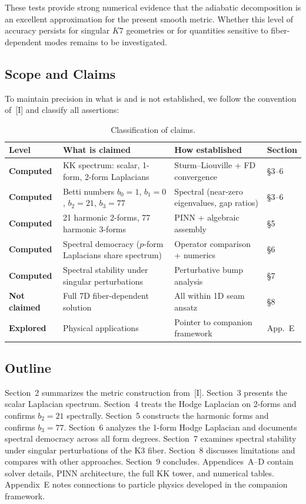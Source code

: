 \documentclass[11pt,a4paper]{article}
\newcommand{\Kseven}{K_7}
\newcommand{\PINN}{\mathrm{PINN}}
\theoremstyle{remark}
\def\Kseven{K7}%
\begin{document}
These tests provide strong numerical evidence that the adiabatic decomposition is
an excellent approximation for the present smooth metric. Whether this level of
accuracy persists for singular $\Kseven$ geometries or for quantities sensitive to
fiber-dependent modes remains to be investigated.

\subsection{Scope and Claims}

To maintain precision in what is and is not established, we follow the convention
of~[I] and classify all assertions:

\begin{table}[htbp]
\centering
\small
\begin{tabular}{p{2.2cm}p{5.5cm}p{4.5cm}p{1.5cm}}
\toprule
Level & What is claimed & How established & Section \\
\midrule
\textbf{Computed} & KK spectrum: scalar, 1-form, 2-form Laplacians & Sturm--Liouville + FD convergence & \S3--6 \\
\textbf{Computed} & Betti numbers $b_0 = 1$, $b_1 = 0$, $b_2 = 21$, $b_3 = 77$ & Spectral (near-zero eigenvalues, gap ratios) & \S3--6 \\
\textbf{Computed} & 21 harmonic 2-forms, 77 harmonic 3-forms & $\PINN$ + algebraic assembly & \S5 \\
\textbf{Computed} & Spectral democracy ($p$-form Laplacians share spectrum) & Operator comparison + numerics & \S6 \\
\textbf{Computed} & Spectral stability under singular perturbations & Perturbative bump analysis & \S7 \\
\textbf{Not claimed} & Full 7D fiber-dependent solution & All within 1D seam ansatz & \S8 \\
\textbf{Explored} & Physical applications & Pointer to companion framework & App.~E \\
\bottomrule
\end{tabular}
\caption{Classification of claims.}
\label{tab:claims}
\end{table}

\subsection{Outline}

Section~2 summarizes the metric construction from~[I]. Section~3 presents the scalar
Laplacian spectrum. Section~4 treats the Hodge Laplacian on 2-forms and confirms
$b_2 = 21$ spectrally. Section~5 constructs the harmonic forms and confirms $b_3 = 77$.
Section~6 analyzes the 1-form Hodge Laplacian and documents spectral democracy
across all form degrees. Section~7 examines spectral stability under singular
perturbations of the K3 fiber. Section~8 discusses limitations and compares with
other approaches. Section~9 concludes. Appendices~A--D contain solver details, $\PINN$
architecture, the full KK tower, and numerical tables. Appendix~E notes
connections to particle physics developed in the companion framework.
\end{document}
